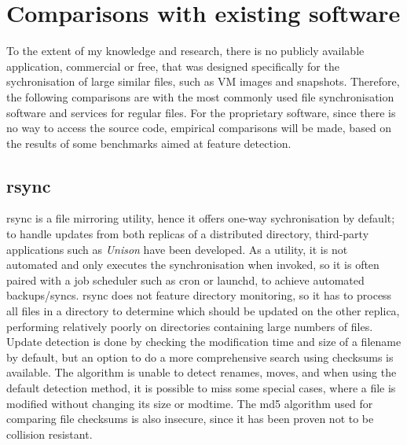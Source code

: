 
\chapter{Comparisons with existing software}

To the extent of my knowledge and research, there is no publicly available application, commercial or free, that was designed specifically for the sychronisation of large similar files, such as VM images and snapshots. Therefore, the following comparisons are with the most commonly used file synchronisation software and services for regular files. For the proprietary software, since there is no way to access the source code, empirical comparisons will be made, based on the results of some benchmarks aimed at feature detection.

\section{rsync}
  rsync is a file mirroring utility, hence it offers one-way sychronisation by default; to handle updates from both replicas of a distributed directory, third-party applications such as \emph{Unison} have been developed. As a utility, it is not automated and only executes the synchronisation when invoked, so it is often paired with a job scheduler such as cron or launchd, to achieve automated backups/syncs. rsync does not feature directory monitoring, so it has to process all files in a directory to determine which should be updated on the other replica, performing relatively poorly on directories containing large numbers of files. Update detection is done by checking the modification time and size of a filename by default, but an option to do a more comprehensive search using checksums is available. The algorithm is unable to detect renames, moves, and when using the default detection method, it is possible to miss some special cases, where a file is modified without changing its size or modtime. The md5 algorithm used for comparing file checksums is also insecure, since it has been proven not to be collision resistant.


